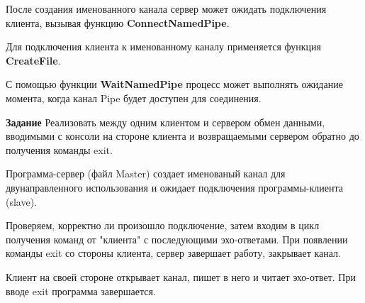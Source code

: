 \documentclass[a4paper]{article}
\begin{document}
	После создания именованного канала сервер может ожидать подключения клиента, вызывая функцию \textbf{ConnectNamedPipe}.
	
	Для подключения клиента к именованному каналу применяется функция \textbf{CreateFile}.
	
	С помощью функции \textbf{WaitNamedPipe} процесс может выполнять ожидание момента, когда канал Pipe будет доступен для соединения.
	
	\textbf{Задание} Реализовать между одним клиентом и сервером обмен данными, вводимыми с консоли на стороне клиента и возвращаемыми сервером обратно до получения команды exit.

	Программа-сервер (файл Master) создает именованый канал для двунаправленного использования и ожидает подключения программы-клиента (slave).
	
	Проверяем, корректно ли произошло подключение, затем входим в цикл получения команд от "клиента" с последующими эхо-ответами. При появлении команды exit со стороны клиента, сервер завершает работу, закрывает канал.
	
	Клиент на своей стороне открывает канал, пишет в него и читает эхо-ответ. При вводе exit программа завершается.
	
\end{document}

